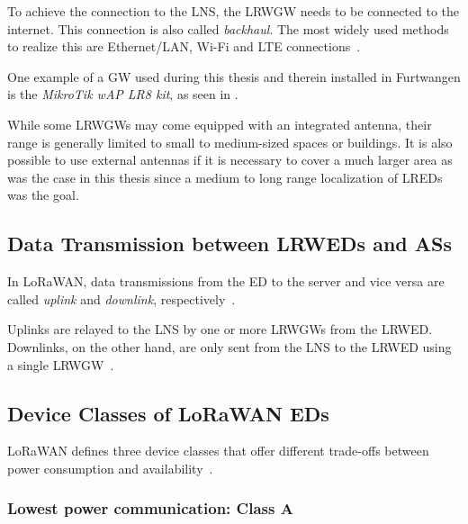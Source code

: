 To achieve the connection to the \ac{LNS}, the \acl{LRWGW} needs to be connected to the internet.
This connection is also called \emph{backhaul}.
The most widely used methods to realize this are Ethernet/\ac{LAN}, Wi-Fi and \ac{LTE} connections~\cite{the_things_industries_bv_lorawan_nodate}.

One example of a \acl{GW} used during this thesis and therein installed in Furtwangen is the \emph{MikroTik wAP LR8 kit}, as seen in .

While some \aclp{LRWGW} may come equipped with an integrated antenna, their range is generally limited to small to medium-sized spaces or buildings.
It is also possible to use external antennas if it is necessary to cover a much larger area as was the case in this thesis since a medium to long range localization of \aclp{LRED} was the goal.

\subsection{Data Transmission between \aclp{LRWED} and \aclp{AS}}

In LoRaWAN, data transmissions from the \acl{ED} to the server and vice versa are called \emph{uplink} and \emph{downlink}, respectively~\cite[p. 12]{lora_alliance_inc_lorawan_specification_2017}.

Uplinks are relayed to the \ac{LNS} by one or more \aclp{LRWGW} from the \acl{LRWED}.
Downlinks, on the other hand, are only sent from the \ac{LNS} to the \acl{LRWED} using a single \acl{LRWGW}~\cite[p. 12]{lora_alliance_inc_lorawan_specification_2017}.

\subsection{Device Classes of \acs{LoRaWAN} \aclp{ED}}\label{sec:device-classes}

\ac{LoRaWAN} defines three device classes that offer different trade-offs between power consumption and availability~\cite[p. 10]{lora_alliance_inc_lorawan_specification_2017}.

\subsubsection{Lowest power communication: Class A}

